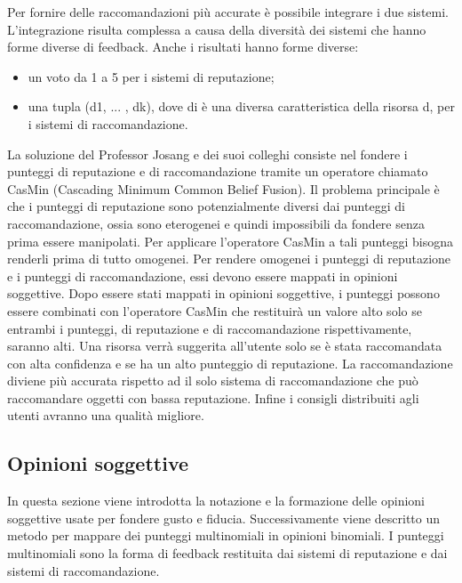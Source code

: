 \documentclass{report}
\begin{document}
	Per fornire delle raccomandazioni più accurate è possibile integrare i
	due sistemi. L'integrazione risulta complessa a causa della diversità
	dei sistemi che hanno forme diverse di feedback. Anche i risultati hanno
	forme diverse:
	
	\begin{itemize}
		\item
		un voto da 1 a 5 per i sistemi di reputazione;
		\item
		una tupla (d1, ... , dk), dove di è una diversa caratteristica della
		risorsa d, per i sistemi di raccomandazione.
	\end{itemize}
	
	La soluzione del Professor Josang e dei suoi colleghi consiste nel
	fondere i punteggi di reputazione e di raccomandazione tramite un
	operatore chiamato CasMin (Cascading Minimum Common Belief Fusion). Il
	problema principale è che i punteggi di reputazione sono potenzialmente
	diversi dai punteggi di raccomandazione, ossia sono eterogenei e quindi
	impossibili da fondere senza prima essere manipolati. Per applicare
	l'operatore CasMin a tali punteggi bisogna renderli prima di tutto
	omogenei. Per rendere omogenei i punteggi di reputazione e i punteggi di
	raccomandazione, essi devono essere mappati in opinioni soggettive. Dopo
	essere stati mappati in opinioni soggettive, i punteggi possono essere
	combinati con l'operatore CasMin che restituirà un valore alto solo se
	entrambi i punteggi, di reputazione e di raccomandazione
	rispettivamente, saranno alti. Una risorsa verrà suggerita all'utente
	solo se è stata raccomandata con alta confidenza e se ha un alto
	punteggio di reputazione. La raccomandazione diviene più accurata
	rispetto ad il solo sistema di raccomandazione che può raccomandare
	oggetti con bassa reputazione. Infine i consigli distribuiti agli utenti
	avranno una qualità migliore.
	
	\hypertarget{header-n47}{%
		\subsection{Opinioni soggettive}\label{header-n47}}
	
	In questa sezione viene introdotta la notazione e la formazione delle
	opinioni soggettive usate per fondere gusto e fiducia. Successivamente
	viene descritto un metodo per mappare dei punteggi multinomiali in
	opinioni binomiali. I punteggi multinomiali sono la forma di feedback
	restituita dai sistemi di reputazione e dai sistemi di raccomandazione.
	
\end{document}
